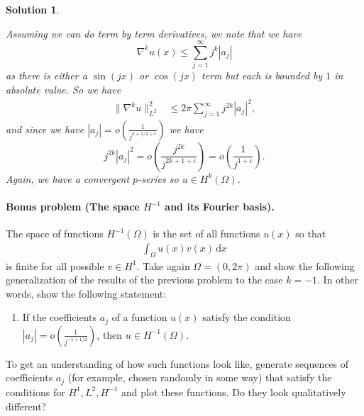 \documentclass[leqno]{article}
\theoremstyle{nonumberplain}
\newtheorem{solution}{Solution}
\begin{document}
\begin{solution}
\begin{enumerate}
\[    \]
    Assuming we can do term by term derivatives, we note that we have
    \[
    \nabla^k u(x) \leq \sum_{j=1}^\infty j^k |a_j|
    \]
    as there is either a $\sin(jx)$ or $\cos(jx)$ term but each is bounded by $1$ in absolute value.  So we have
    \begin{align*}
        \|\nabla^k u\|_{L^2}^2 &\leq 2\pi \sum_{j=1}^\infty j^{2k} |a_j|^2,
    \end{align*}
    and since we have $|a_j|=o\left(\frac{1}{j^{k+1/2+\epsilon}}\right)$ we have
    \[
    j^{2k}|a_j|^2 = o\left(\frac{j^{2k}}{j^{2k+1+\epsilon}}\right)=o\left(\frac{1}{j^{1+\epsilon}}\right).
    \]
    Again, we have a convergent $p$-series so $u\in H^k(\Omega)$.
\end{enumerate}
\end{solution}
\pagebreak

\paragraph{Bonus problem (The space $H^{-1}$ and its Fourier basis).}
The space of functions $H^{-1}(\Omega)$ is the set of all functions
$u(x)$ so that
\begin{align*}
  \int_\Omega u(x) v(x) \, \text{d}x
\end{align*}
is finite for all possible $v\in H^1$. Take again $\Omega=(0,2\pi)$
and show the following generalization of the results of the previous
problem to the case $k=-1$. In other words, show the following
statement:
\begin{enumerate}
\item If the coefficients $a_j$ of a function $u(x)$ satisfy the condition 
$|a_j| = o\left(\frac{1}{j^{-1+1/2}}\right)$, then $u\in H^{-1}(\Omega)$.
\end{enumerate}
To get an understanding of how such functions look like, generate
sequences of coefficients $a_j$ (for example, chosen randomly in some
way) that satisfy the conditions for $H^1,L^2,H^{-1}$ and plot these
functions. Do they look qualitatively different?
\end{document}
